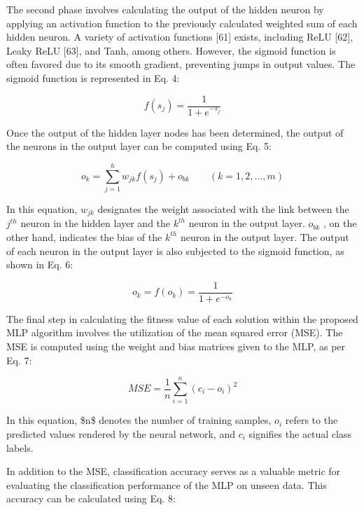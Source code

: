 The second phase involves calculating the output of the hidden neuron by applying an activation function to the previously calculated weighted sum of each hidden neuron. A variety of activation functions [61] exists, including ReLU [62], Leaky ReLU [63], and Tanh, among others. However, the sigmoid function is often favored due to its smooth gradient, preventing jumps in output values. The sigmoid function is represented in Eq. 4:

\begin{equation}
f(s_{j})={\frac{1}{1+e^{-s_{j}}}}
\end{equation}

Once the output of the hidden layer nodes has been determined, the output of the neurons in the output layer can be computed using Eq. 5:

\begin{equation}
o_{k}=\sum_{j=1}^{h}w_{j k}f(s_{j})+o_{b k}\qquad(k=1,2,...,m)
\end{equation}

In this equation, $w_{j k}$ designates the weight associated with the link between the $j^{t h}$ neuron in the hidden layer and the $k^{t h}$ neuron in the output layer. $o_{b k}$ , on the other hand, indicates the bias of the $k^{t h}$ neuron in the output layer. The output of each neuron in the output layer is also subjected to the sigmoid function, as shown in Eq. 6:

\begin{equation}
o_{k}=f(o_{k})=\frac{1}{1+e^{-o_{k}}}
\end{equation}

The final step in calculating the fitness value of each solution within the proposed MLP algorithm involves the utilization of the mean squared error (MSE). The MSE is computed using the weight and bias matrices given to the MLP, as per Eq. 7:

\begin{equation}
M S E=\frac{1}{n}\sum_{i=1}^{n}(c_{i}-o_{i})^{2}
\end{equation}

In this equation, \$n\$ denotes the number of training samples, $o_{i}$ refers to the predicted values rendered by the neural network, and $c_{i}$ signifies the actual class labels.

In addition to the MSE, classification accuracy serves as a valuable metric for evaluating the classification performance of the MLP on unseen data. This accuracy can be calculated using Eq. 8:

